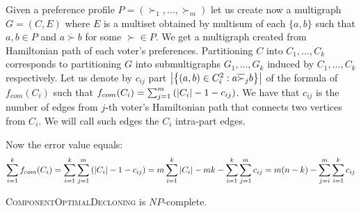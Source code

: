 Given a preference profile $P = (\succ_1, ..., \succ_m)$ let us create now a multigraph $G=(C,E)$
where $E$ is a multiset obtained by multisum
of each $\{a,b\}$ such that $a,b \in P$ and $a \overline{\succ} b$ for some $\succ \in P$.
We get a multigraph created from Hamiltonian path of each voter's preferences.
Partitioning $C$ into $C_1,...,C_k$ corresponds to
partitioning $G$ into submultigraphs $G_1,...,G_k$ induced by $C_1,...,C_k$ respectively.
Let us denote by $c_{ij}$ part
$\left\vert \left\lbrace \left( a,b \right) \in C_i^2 : a \overline{\succ}_j b \right\rbrace  \right\vert$
of the formula of $f_{com}(C_i)$ such that
$f_{com}(C_i) = \sum_{j=1}^m \left( \left\vert C_i \right\vert - 1 - c_{ij} \right)$.
We have that $c_{ij}$ is the number of edges from $j$-th voter's Hamiltonian path
that connects two vertices from $C_i$.
We will call such edges the $C_i$ intra-part edges.

Now the error value equals:
$$
\sum_{i=1}^k f_{com}(C_i) =
\sum_{i=1}^k \sum_{j=1}^m \left( \left\vert C_i \right\vert - 1 - c_{ij} \right) =
m \sum_{i=1}^k \left\vert C_i \right\vert - m k - \sum_{i=1}^k \sum_{j=1}^m c_{ij} =
m(n-k) - \sum_{j=i}^m \sum_{i=1}^k c_{ij}
$$




\begin{thm}
\textsc{ComponentOptimalDecloning} is $NP$-complete.
\end{thm}